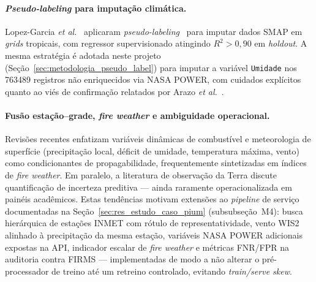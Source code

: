 \documentclass[tcc2]{uftex}
\begin{document}
\paragraph{\emph{Pseudo-labeling} para imputação climática.} Lopez-Garcia \emph{et al.}~\cite{lopezgarcia2024spatiotemporal} aplicaram \emph{pseudo-labeling}~\cite{lee2013pseudo} para imputar dados SMAP em \emph{grids} tropicais, com regressor supervisionado atingindo \(R^2 > 0{,}90\) em \emph{holdout}. A mesma estratégia é adotada neste projeto (Seção~\ref{sec:metodologia_pseudo_label}) para imputar a variável \texttt{Umidade} nos \num{763489} registros não enriquecidos via NASA POWER, com cuidados explícitos quanto ao viés de confirmação relatados por Arazo \emph{et al.}~\cite{arazo2020pseudo}.

\paragraph{Fusão estação--grade, \emph{fire weather} e ambiguidade operacional.} Revisões recentes enfatizam variáveis dinâmicas de combustível e meteorologia de superfície (precipitação local, déficit de umidade, temperatura máxima, vento) como condicionantes de propagabilidade, frequentemente sintetizadas em índices de \emph{fire weather}. Em paralelo, a literatura de observação da Terra discute quantificação de incerteza preditiva --- ainda raramente operacionalizada em painéis acadêmicos. Estas tendências motivam extensões ao \emph{pipeline} de serviço documentadas na Seção~\ref{sec:res_estudo_caso_pium} (subsubseção~M4): busca hierárquica de estações INMET com rótulo de representatividade, vento WIS2 alinhado à precipitação da mesma estação, variáveis NASA POWER adicionais expostas na API, indicador escalar de \emph{fire weather} e métricas FNR/FPR na auditoria contra FIRMS --- implementadas de modo a não alterar o pré-processador de treino até um retreino controlado, evitando \emph{train/serve skew}.
\end{document}
